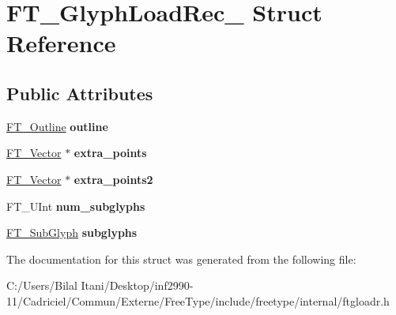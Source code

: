 \hypertarget{struct_f_t___glyph_load_rec__}{}\section{F\+T\+\_\+\+Glyph\+Load\+Rec\+\_\+ Struct Reference}
\label{struct_f_t___glyph_load_rec__}
\subsection*{Public Attributes}
\begin{DoxyCompactItemize}
\item 
\hyperlink{struct_f_t___outline__}{F\+T\+\_\+\+Outline} {\bfseries outline}\hypertarget{struct_f_t___glyph_load_rec___ae340cdb5263322e86c640b15f82ea72a}{}\label{struct_f_t___glyph_load_rec___ae340cdb5263322e86c640b15f82ea72a}

\item 
\hyperlink{struct_f_t___vector__}{F\+T\+\_\+\+Vector} $\ast$ {\bfseries extra\+\_\+points}\hypertarget{struct_f_t___glyph_load_rec___ad2547bd6a7c7473d3a4646dfe908f1c3}{}\label{struct_f_t___glyph_load_rec___ad2547bd6a7c7473d3a4646dfe908f1c3}

\item 
\hyperlink{struct_f_t___vector__}{F\+T\+\_\+\+Vector} $\ast$ {\bfseries extra\+\_\+points2}\hypertarget{struct_f_t___glyph_load_rec___a5e8bbe62bd889e806700bc0d583ff79b}{}\label{struct_f_t___glyph_load_rec___a5e8bbe62bd889e806700bc0d583ff79b}

\item 
F\+T\+\_\+\+U\+Int {\bfseries num\+\_\+subglyphs}\hypertarget{struct_f_t___glyph_load_rec___a71dc4ab52b956b974fe65c95a098e03c}{}\label{struct_f_t___glyph_load_rec___a71dc4ab52b956b974fe65c95a098e03c}

\item 
\hyperlink{struct_f_t___sub_glyph_rec__}{F\+T\+\_\+\+Sub\+Glyph} {\bfseries subglyphs}\hypertarget{struct_f_t___glyph_load_rec___a12ef145fedbeb14cc8b9d320ae3fed96}{}\label{struct_f_t___glyph_load_rec___a12ef145fedbeb14cc8b9d320ae3fed96}

\end{DoxyCompactItemize}


The documentation for this struct was generated from the following file\+:\begin{DoxyCompactItemize}
\item 
C\+:/\+Users/\+Bilal Itani/\+Desktop/inf2990-\/11/\+Cadriciel/\+Commun/\+Externe/\+Free\+Type/include/freetype/internal/ftgloadr.\+h\end{DoxyCompactItemize}
